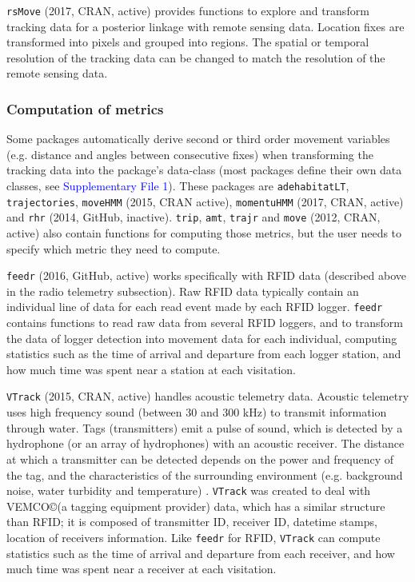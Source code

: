 \documentclass[a4paper,12pt]{article}
\newcommand{\Rpkg}[1]{\texttt{#1}}
\begin{document}
\Rpkg{rsMove} (2017, CRAN, active) provides functions to explore and transform tracking data for a posterior linkage with remote sensing data. Location fixes are transformed into pixels and grouped into regions. The spatial or temporal resolution of the tracking data can be changed to match the resolution of the remote sensing data. 

\subsubsection*{Computation of metrics}

Some packages automatically derive second or third order movement variables (e.g. distance and angles between consecutive fixes) when transforming the tracking data into the package's data-class (most packages define their own data classes, see \textcolor{blue}{Supplementary File 1}). These packages are \Rpkg{adehabitatLT}, \Rpkg{trajectories}, \Rpkg{moveHMM} (2015, CRAN active), \Rpkg{momentuHMM} (2017, CRAN, active) and \Rpkg{rhr} (2014, GitHub, inactive). \Rpkg{trip}, \Rpkg{amt}, \Rpkg{trajr} and \Rpkg{move} (2012, CRAN, active) also contain functions for computing those metrics, but the user needs to specify which metric they need to compute. 

\Rpkg{feedr} (2016, GitHub, active) works specifically with RFID data (described above in the radio telemetry subsection). Raw RFID data typically contain an individual line of data for each read event made by each RFID logger. \Rpkg{feedr} contains functions to read raw data from several RFID loggers, and to transform the data of logger detection into movement data for each individual, computing statistics such as the time of arrival and departure from each logger station, and how much time was spent near a station at each visitation. 

\Rpkg{VTrack} (2015, CRAN, active) handles acoustic telemetry data. Acoustic telemetry uses high frequency sound (between 30 and 300 kHz) to transmit information through water. Tags (transmitters) emit a pulse of sound, which is detected by a hydrophone (or an array of hydrophones) with an acoustic receiver. The distance at which a transmitter can be detected depends on the power and frequency of the tag, and the characteristics of the surrounding environment (e.g. background noise, water turbidity and temperature) \citep{Decelles2014}. \Rpkg{VTrack} was created to deal with VEMCO\copyright  (a tagging equipment provider) data, which has a similar structure than RFID; it is composed of transmitter ID, receiver ID, datetime stamps, location of receivers information. Like \Rpkg{feedr} for RFID, \Rpkg{VTrack} can compute statistics such as the time of arrival and departure from each receiver, and how much time was spent near a receiver at each visitation.
\end{document}
